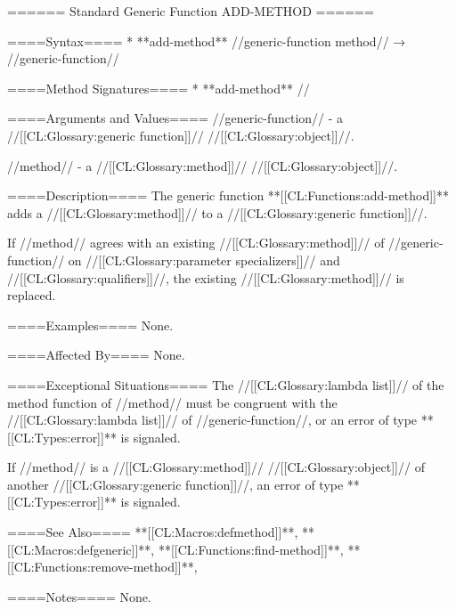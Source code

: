 ====== Standard Generic Function ADD-METHOD ======

====Syntax====
  * **add-method** //generic-function method// → //generic-function//

====Method Signatures====
  * **add-method** //

====Arguments and Values====
//generic-function// - a //[[CL:Glossary:generic function]]// //[[CL:Glossary:object]]//.

//method// - a //[[CL:Glossary:method]]// //[[CL:Glossary:object]]//.

====Description====
The generic function **[[CL:Functions:add-method]]** adds a //[[CL:Glossary:method]]// to a //[[CL:Glossary:generic function]]//.

If //method// agrees with an existing //[[CL:Glossary:method]]// of //generic-function// on //[[CL:Glossary:parameter specializers]]// and //[[CL:Glossary:qualifiers]]//, the existing //[[CL:Glossary:method]]// is replaced.

====Examples====
None.

====Affected By====
None.

====Exceptional Situations====
The //[[CL:Glossary:lambda list]]// of the method function of //method// must be congruent with the //[[CL:Glossary:lambda list]]// of //generic-function//, or an error of type **[[CL:Types:error]]** is signaled.

If //method// is a //[[CL:Glossary:method]]// //[[CL:Glossary:object]]// of another //[[CL:Glossary:generic function]]//, an error of type **[[CL:Types:error]]** is signaled.

====See Also====
**[[CL:Macros:defmethod]]**, **[[CL:Macros:defgeneric]]**, **[[CL:Functions:find-method]]**, **[[CL:Functions:remove-method]]**, {\secref\SpecializerQualifierAgreement}

====Notes====
None.

